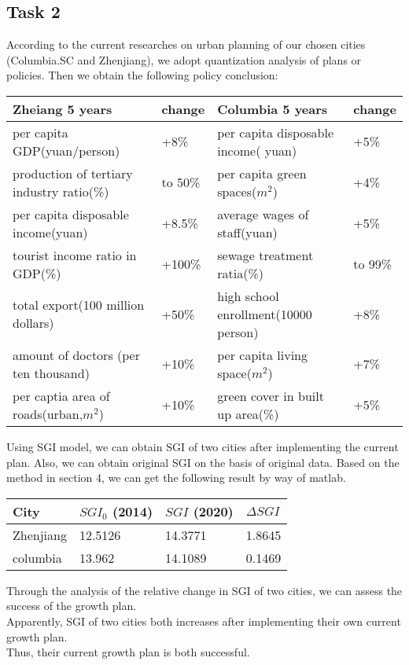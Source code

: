 \documentclass{mcmthesis}
\begin{document}
\subsection{Task 2}%

According to the current researches on urban planning of our chosen cities (Columbia.SC and Zhenjiang), we adopt quantization analysis of plans or policies. Then we obtain the following policy conclusion:\\
\begin{table}[h]

\centering
{}
\begin{tabular}{p{5.2cm}|p{1.2cm}|p{5.2cm}|p{1.2cm}}
\hline
\bf Zheiang 5 years	 & \bf change	 & \bf Columbia 5 years	& \bf change \\
\hline
 per capita GDP(yuan/person)	& +8\%	& per capita disposable income( yuan)	& +5\% \\
production of tertiary industry ratio(\%)	& to 50\%	& per capita green spaces($m^2$)	& +4\% \\
per capita disposable income(yuan)	& +8.5\%	& average wages of staff(yuan)	& +5\% \\
tourist income ratio in GDP(\%)	& +100\%	& sewage treatment ratia(\%)	& to 99\% \\
total export(100 million dollars)	& +50\%	& high school enrollment(10000 person)	& +8\% \\
amount of doctors (per ten thousand)	& +10\%	& per capita living space($m^2$)	& +7\% \\
per captia area of roads(urban,$m^2$)	& +10\%	& green cover in built up area(\%)	& +5\% \\
\hline
\end{tabular}
\end{table}

\noindent Using SGI model, we can obtain SGI of two cities after implementing the current plan. Also, we can obtain original SGI on the basis of original data. Based on the method in section 4, we can get the following result by way of matlab.\\

\begin{table}[h]
\setlength{\abovecaptionskip}{0pt}
\setlength{\belowcaptionskip}{0pt}
\begin{tabular}{p{3.3cm}|p{3cm}|p{3cm}|p{3.3cm}}
\hline
City	& $SGI_0$ (2014)	& $SGI$ (2020)	& $\Delta SGI$ \\
\hline
Zhenjiang	& 12.5126	& 14.3771	& 1.8645 \\
columbia	& 13.962	& 14.1089	& 0.1469 \\
\hline
\end{tabular}
\end{table}
\noindent Through the analysis of the relative change in SGI of two cities, we can assess the success of the growth plan.\\
Apparently, SGI of two cities both increases after implementing their own current growth plan. \\
Thus, their current growth plan is both successful.\\
\end{document}
